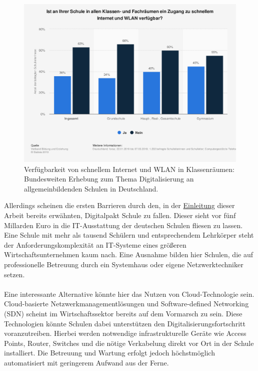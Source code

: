 \begin{figure}[H]
	\centering
	\includegraphics[width=0.8\linewidth]{bilder/statista_wlan}
	\caption[Verfügbarkeit von schnellem Internet und WLAN in Klassenräumen]{Verfügbarkeit von schnellem Internet und WLAN in Klassenräumen: Bundesweiten Erhebung zum Thema Digitalisierung an allgemeinbildenden Schulen in Deutschland. \cite{VBE2019}}
	\label{fig:statistawlan}
\end{figure}


Allerdings scheinen die ersten Barrieren durch den, in der  \hyperref[sec:einleitung]{Einleitung} dieser Arbeit bereits erwähnten, Digitalpakt Schule zu fallen. Dieser sieht vor fünf Millarden Euro in die IT-Ausstattung der deutschen Schulen fliesen zu lassen. Eine Schule mit mehr als tausend Schülern und entsprechendem Lehrkörper steht der Anforderungskomplexität an IT-Systeme eines größeren Wirtschaftsunternehmen kaum nach. Eine Ausnahme bilden hier Schulen, die auf professionelle Betreuung durch ein Systemhaus oder eigene Netzwerktechniker setzen\cite{Koenzen2018}. \\ \\ Eine interessante Alternative könnte hier das Nutzen von Cloud-Technologie sein. Cloud-basierte Netzwerkmanagementlösungen und Software-defined Networking (SDN) scheint im Wirtschaftssektor bereits auf dem Vormarsch zu sein. Diese Technologien könnte Schulen dabei unterstützen den Digitalisierungsfortschritt voranzutreiben. Hierbei werden notwendige infrastrukturelle Geräte wie Access Points, Router, Switches und die nötige Verkabelung direkt vor Ort in der Schule installiert. Die Betreuung und Wartung erfolgt jedoch höchstmöglich automatisiert mit geringerem Aufwand aus der Ferne. 



